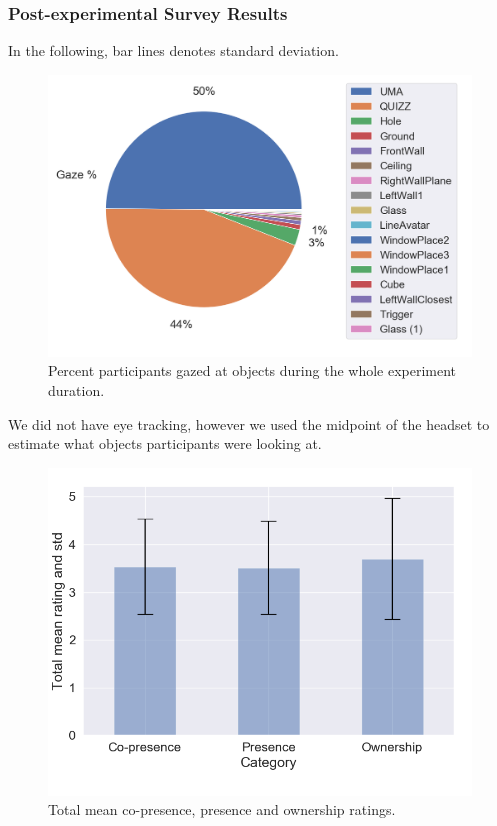 \subsubsection{Post-experimental Survey Results}

In the following, bar lines denotes standard deviation.


\begin{figure}[H]
 \centering
 \includegraphics[scale=0.5]{Files/Plots/gaze_plots.png}
 \caption{Percent participants gazed at objects during the whole experiment duration. }
\label{fig:gazePie}
\end{figure}

We did not have eye tracking, however we used the midpoint of the headset to estimate what objects participants were looking at.

\begin{figure}[H]
 \centering
 \includegraphics[scale=0.5]{Files/Plots/misc_all_mean.png}
 \caption{Total mean co-presence, presence and ownership ratings.}
\label{fig:miscAll}
\end{figure}


